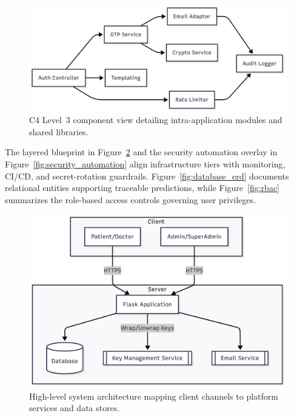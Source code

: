 \documentclass[12pt]{article}
\begin{document}
\begin{figure}[t]
  \centering
  \includegraphics[width=0.9\linewidth]{c4_level_3_components.png}
  \caption{C4 Level~3 component view detailing intra-application modules and shared libraries.}
  \label{fig:c4_components}
\end{figure}

The layered blueprint in Figure~\ref{fig:system_arch} and the security automation overlay in Figure~\ref{fig:security_automation} align infrastructure tiers with monitoring, CI/CD, and secret-rotation guardrails. Figure~\ref{fig:database_erd} documents relational entities supporting traceable predictions, while Figure~\ref{fig:rbac} summarizes the role-based access controls governing user privileges.

\begin{figure}[t]
  \centering
  \includegraphics[width=0.9\linewidth]{high_level_system_architecture.png}
  \caption{High-level system architecture mapping client channels to platform services and data stores.}
  \label{fig:system_arch}
\end{figure}
\end{document}
